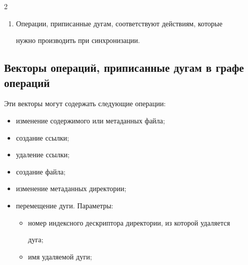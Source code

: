 \begin{multicols}{2}
\begin{enumerate}[1.]
директории.\\[-15pt]


\item Операции, приписанные дугам, соответствуют действиям, которые 


нужно производить при синхронизации. 


\end{enumerate}





\vspace*{-3pt}


\subsection{Векторы операций, приписанные дугам в графе операций}


      


      Эти векторы могут содержать следующие операции:


      \begin{itemize}


\item изменение содержимого или метаданных \mbox{файла;}\\[-15pt]


\item создание ссылки;\\[-15pt]


\item удаление ссылки;\\[-15pt]


\item создание файла;\\[-15pt]


\item изменение метаданных директории;\\[-15pt]


\item перемещение дуги. Параметры: 


\begin{itemize}


\item номер индексного дескриптора директории, из которой удаляется 


дуга;\\[-14pt]


\item имя удаляемой дуги;


\end{itemize}



\end{itemize}
\end{multicols}
